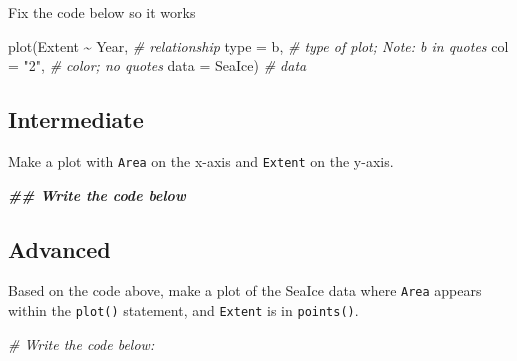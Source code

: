 \documentclass[
]{book}
\newenvironment{Shaded}{\begin{snugshade}}{\end{snugshade}}
\newcommand{\AttributeTok}[1]{\textcolor[rgb]{0.77,0.63,0.00}{#1}}
\newcommand{\CommentTok}[1]{\textcolor[rgb]{0.56,0.35,0.01}{\textit{#1}}}
\newcommand{\DocumentationTok}[1]{\textcolor[rgb]{0.56,0.35,0.01}{\textbf{\textit{#1}}}}
\newcommand{\FunctionTok}[1]{\textcolor[rgb]{0.00,0.00,0.00}{#1}}
\newcommand{\NormalTok}[1]{#1}
\newcommand{\SpecialCharTok}[1]{\textcolor[rgb]{0.00,0.00,0.00}{#1}}
\newcommand{\StringTok}[1]{\textcolor[rgb]{0.31,0.60,0.02}{#1}}
\begin{document}
Fix the code below so it works

\begin{Shaded}
\begin{Highlighting}[]
\FunctionTok{plot}\NormalTok{(Extent }\SpecialCharTok{\textasciitilde{}}\NormalTok{ Year,  }\CommentTok{\# relationship}
     \AttributeTok{type =}\NormalTok{ b,     }\CommentTok{\# type of plot; Note: b in quotes}
     \AttributeTok{col =} \StringTok{"2"}\NormalTok{,        }\CommentTok{\# color; no quotes}
     \AttributeTok{data =}\NormalTok{ SeaIce)  }\CommentTok{\# data}
\end{Highlighting}
\end{Shaded}

\hypertarget{intermediate}{%
\subsection{Intermediate}\label{intermediate}}

Make a plot with \texttt{Area} on the x-axis and \texttt{Extent} on the y-axis.

\begin{Shaded}
\begin{Highlighting}[]
\DocumentationTok{\#\# Write the code below}
\end{Highlighting}
\end{Shaded}

\hypertarget{advanced}{%
\subsection{Advanced}\label{advanced}}

Based on the code above, make a plot of the SeaIce data where \texttt{Area} appears within the \texttt{plot()} statement, and \texttt{Extent} is in \texttt{points()}.

\begin{Shaded}
\begin{Highlighting}[]
\CommentTok{\# Write the code below: }
\end{Highlighting}
\end{Shaded}


  
\end{document}
